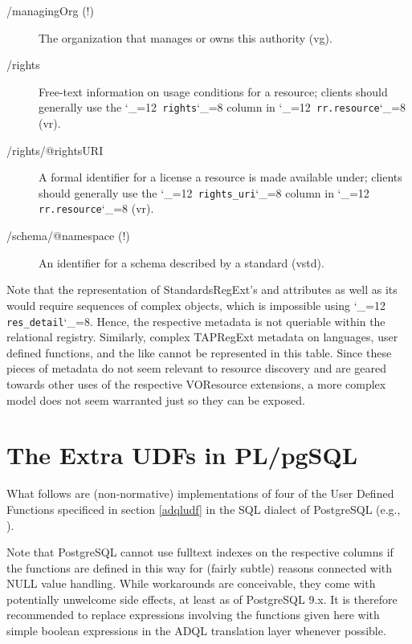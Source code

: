 \documentclass[11pt,a4paper]{ivoa}
\makeatletter
\def\rtent#1{\texttt{\color{rtcolor}\verb|#1|}}
\def\makeunderscoreletter{\catcode`\_=12}
\def\makeunderscoresubscript{\catcode`\_=8}
\def\rtent{\makeunderscoreletter\relax\rt@nt}
\def\rt@nt#1{\texttt{\color{rtcolor} #1}\makeunderscoresubscript{}}
\makeatother
\begin{document}
\begin{description}
\item[/managingOrg (!)]The organization that manages or owns this authority (vg).
\item[/rights]Free-text information on usage conditions for a resource;
clients should generally use the \rtent{rights} column in
\rtent{rr.resource} (vr).
\item[/rights/@rightsURI]A formal identifier for a license a
resource is made available under; clients should generally use the
\rtent{rights_uri} column in \rtent{rr.resource} (vr).
\item[/schema/@namespace (!)]An identifier for a schema described by a standard (vstd).

\end{description}

Note that the representation of StandardsRegExt's
  and 
attributes as well as its  would require sequences of
complex objects, which is impossible using \rtent{res_detail}.
Hence, the respective metadata is not queriable
within the relational registry. Similarly, complex TAPRegExt metadata on
languages, user defined functions, and the like cannot be
represented in this table.  Since these pieces of metadata do not seem
relevant to resource discovery and are geared towards other uses of the
respective VOResource extensions, a more complex model does not seem
warranted just so they can be exposed.



\section{The Extra UDFs in
PL/pgSQL}

\label{appPGDefs}

What follows are (non-normative)
implementations of four of the User Defined Functions
specificed in section \ref{adqludf} in the SQL dialect
of PostgreSQL (e.g., \citet{doc:Postgres92}).

Note that PostgreSQL cannot use fulltext indexes on the respective
columns if the functions are defined in this way for (fairly subtle)
reasons connected with NULL value handling.  While workarounds are
conceivable, they come with potentially unwelcome side effects, at least
as of PostgreSQL 9.x.  It is therefore recommended to replace
expressions involving the functions given here with simple boolean
expressions in the ADQL translation layer whenever possible.
\end{document}
